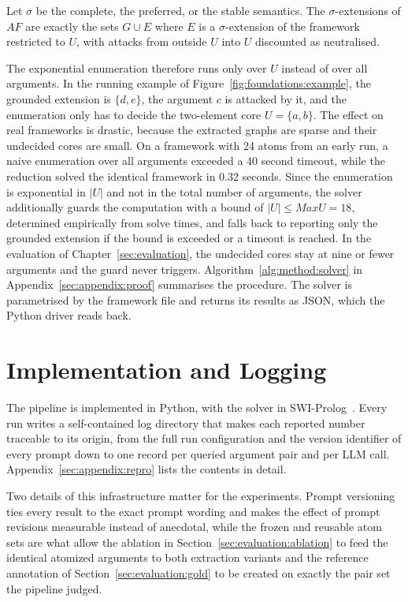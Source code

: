 \begin{proposition}
\label{prop:method:reduction}
Let $\sigma$ be the complete, the preferred, or the stable semantics. The
$\sigma$-extensions of $AF$ are exactly the sets $G \cup E$ where $E$ is a
$\sigma$-extension of the framework restricted to $U$, with attacks from
outside $U$ into $U$ discounted as neutralised.
\end{proposition}

The exponential enumeration therefore runs only over $U$ instead of over all
arguments. In the running example of Figure~\ref{fig:foundations:example}, the
grounded extension is $\{d, e\}$, the argument $c$ is attacked by it, and the
enumeration only has to decide the two-element core $U = \{a, b\}$. The effect
on real frameworks is drastic, because the extracted graphs are sparse and
their undecided cores are small. On a framework with 24 atoms from an early
run, a naive enumeration over all arguments exceeded a 40 second timeout, while
the reduction solved the identical framework in 0.32 seconds. Since the
enumeration is exponential in $|U|$ and not in the total number of arguments,
the solver additionally guards the computation with a bound of
$|U| \leq \mathit{MaxU} = 18$, determined empirically from solve times, and
falls back to reporting only the grounded extension if the bound is exceeded or
a timeout is reached. In the evaluation of Chapter~\ref{sec:evaluation}, the
undecided cores stay at nine or fewer arguments and the guard never triggers.
Algorithm~\ref{alg:method:solver} in Appendix~\ref{sec:appendix:proof}
summarises the procedure. The solver is
parametrised by the framework file and returns its results as JSON, which the
Python driver reads back.

\section{Implementation and Logging}
\label{sec:method:logging}

The pipeline is implemented in Python, with the solver in
SWI-Prolog~\cite{swiprolog2012}. Every run writes a self-contained log
directory that makes each reported number traceable to its origin, from the
full run configuration and the version identifier of every prompt down to one
record per queried argument pair and per LLM call.
Appendix~\ref{sec:appendix:repro} lists the contents in detail.

Two details of this infrastructure matter for the experiments. Prompt
versioning ties every result to the exact prompt wording and makes the effect
of prompt revisions measurable instead of anecdotal, while the frozen and
reusable atom sets are what allow the ablation in
Section~\ref{sec:evaluation:ablation} to feed the identical atomized arguments
to both extraction variants and the reference annotation of
Section~\ref{sec:evaluation:gold} to be created on exactly the pair set
the pipeline judged.
